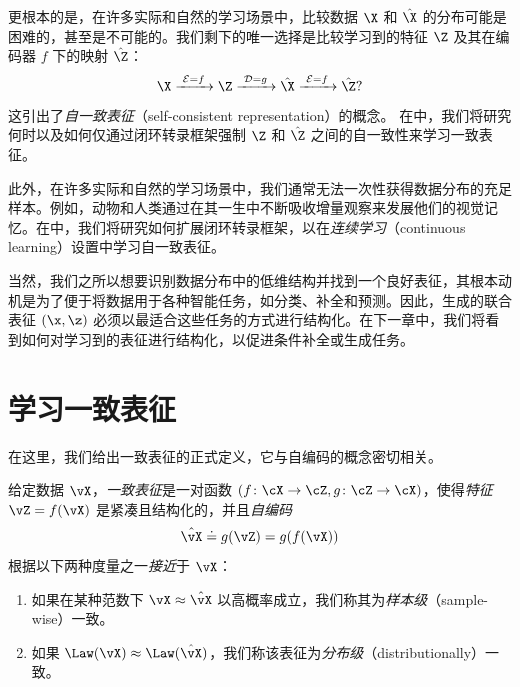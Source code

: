 \documentclass[../../book-main_zh.tex]{subfiles}
\begin{document}
更根本的是，在许多实际和自然的学习场景中，比较数据 $\X$ 和 $\hat \X$ 的分布可能是困难的，甚至是不可能的。我们剩下的唯一选择是比较学习到的特征 $\Z$ 及其在编码器 $f$ 下的映射 $\hat \Z$：
\begin{equation}
    \X
    \xrightarrow{\hspace{1mm} \mathcal{E} = f \hspace{1mm}} \Z
    \xrightarrow{\hspace{1mm} \mathcal{D} = g \hspace{1mm}} \hat{\X}
    \xrightarrow{\hspace{1mm} \mathcal{E} = f \hspace{1mm}} \hat \Z?
\end{equation}
这引出了{\em 自一致表征}（self-consistent representation）的概念。
在中，我们将研究何时以及如何仅通过闭环转录框架强制 $\Z$ 和 $\hat \Z$ 之间的自一致性来学习一致表征。

此外，在许多实际和自然的学习场景中，我们通常无法一次性获得数据分布的充足样本。例如，动物和人类通过在其一生中不断吸收增量观察来发展他们的视觉记忆。在中，我们将研究如何扩展闭环转录框架，以在{\em 连续学习}（continuous learning）设置中学习自一致表征。

当然，我们之所以想要识别数据分布中的低维结构并找到一个良好表征，其根本动机是为了便于将数据用于各种智能任务，如分类、补全和预测。因此，生成的联合表征 $(\x, \z)$ 必须以最适合这些任务的方式进行结构化。在下一章中，我们将看到如何对学习到的表征进行结构化，以促进条件补全或生成任务。

\section{学习一致表征}\label{sec:consistent-representation}

在这里，我们给出一致表征的正式定义，它与自编码的概念密切相关。 %
\begin{definition}[一致表征]\label{def:bidirectional_rep}
    给定数据 \(\vX\)，\textit{一致表征}是一对函数 \((f \colon \cX \to \cZ, g \colon \cZ \to \cX)\)，使得\textit{特征} \(\vZ = f(\vX)\) 是紧凑且结构化的，并且\textit{自编码}
    \begin{equation}
        \hat{\vX} \doteq g(\vZ) = g(f(\vX))
    \end{equation}
    根据以下两种度量之一\textit{接近}于 \(\vX\)：
    \begin{enumerate}
        \item 如果在某种范数下 \(\vX \approx \hat{\vX}\) 以高概率成立，我们称其为\textit{样本级}（sample-wise）一致。
        \item 如果 \(\Law(\vX) \approx \Law(\hat{\vX})\)，我们称该表征为\textit{分布级}（distributionally）一致。
    \end{enumerate}
\end{definition}
\end{document}
